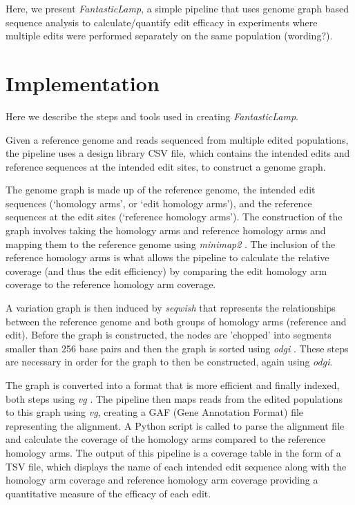 \documentclass{bioinfo}
\theoremstyle{definition}
\begin{document}
Here, we present \textit{FantasticLamp}, a simple pipeline that uses genome graph based sequence analysis to calculate/quantify edit efficacy in experiments where multiple edits were performed separately on the same population (wording?). 



\section{Implementation}
\label{sec:implementation}
Here we describe the steps and tools used in creating \textit{FantasticLamp}. 



Given a reference genome and reads sequenced from multiple edited populations, the pipeline uses a design library CSV file, which contains the intended edits and reference sequences at the intended edit sites, to construct a genome graph.

The genome graph is made up of the reference genome, the intended edit sequences (`homology arms', or `edit homology arms'), and the reference sequences at the edit sites (`reference homology arms').
The construction of the graph involves taking the homology arms and reference homology arms and mapping them to the reference genome using \textit{minimap2} \citep{li2018minimap2}.
The inclusion of the reference homology arms is what allows the pipeline to calculate the relative coverage (and thus the edit efficiency) by comparing the edit homology arm coverage to the reference homology arm coverage.

A variation graph is then induced by \textit{seqwish} \citep{garrison2023unbiased} that represents the relationships between the reference genome and both groups of homology arms (reference and edit).
Before the graph is constructed, the nodes are 'chopped' into segments smaller than 256 base pairs and then the graph is sorted using \textit{odgi} \citep{guarracino2022odgi}.
These steps are necessary in order for the graph to then be constructed, again using \textit{odgi}. 

The graph is converted into a format that is more efficient and finally indexed, both steps using \textit{vg} \citep{garrison2018variation}.
The pipeline then maps reads from the edited populations to this graph using \textit{vg}, creating a GAF (Gene Annotation Format) file representing the alignment.
A Python script is called to parse the alignment file and calculate the coverage of the homology arms compared to the reference homology arms.
The output of this pipeline is a coverage table in the form of a TSV file, which displays the name of each intended edit sequence along with the homology arm coverage and reference homology arm coverage providing a quantitative measure of the efficacy of each edit.
  
\end{document}
